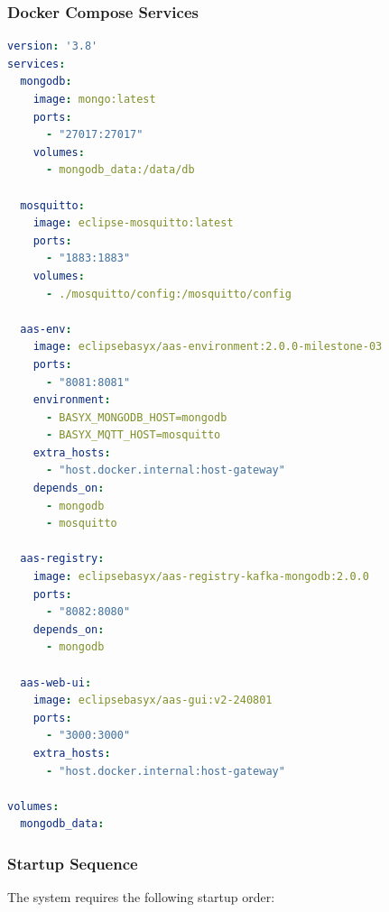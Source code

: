 \subsubsection{Docker Compose Services}

\begin{lstlisting}[language=yaml, caption={Docker Compose Configuration (excerpt)}, label={lst:docker_compose}]
version: '3.8'
services:
  mongodb:
    image: mongo:latest
    ports:
      - "27017:27017"
    volumes:
      - mongodb_data:/data/db

  mosquitto:
    image: eclipse-mosquitto:latest
    ports:
      - "1883:1883"
    volumes:
      - ./mosquitto/config:/mosquitto/config

  aas-env:
    image: eclipsebasyx/aas-environment:2.0.0-milestone-03
    ports:
      - "8081:8081"
    environment:
      - BASYX_MONGODB_HOST=mongodb
      - BASYX_MQTT_HOST=mosquitto
    extra_hosts:
      - "host.docker.internal:host-gateway"
    depends_on:
      - mongodb
      - mosquitto

  aas-registry:
    image: eclipsebasyx/aas-registry-kafka-mongodb:2.0.0
    ports:
      - "8082:8080"
    depends_on:
      - mongodb

  aas-web-ui:
    image: eclipsebasyx/aas-gui:v2-240801
    ports:
      - "3000:3000"
    extra_hosts:
      - "host.docker.internal:host-gateway"

volumes:
  mongodb_data:
\end{lstlisting}

\subsubsection{Startup Sequence}

The system requires the following startup order:

